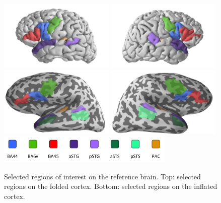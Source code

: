 \begin{figure}[h]
\begin{center}
\vspace{7mm}
\includegraphics[width=0.49\textwidth]{pics/dh55a-pial-lh}
\includegraphics[width=0.49\textwidth]{pics/dh55a-pial-rh}
\includegraphics[width=0.49\textwidth]{pics/dh55a-inflated-lh}
\includegraphics[width=0.49\textwidth]{pics/dh55a-inflated-rh}
\includegraphics[width=0.75\textwidth]{pics/3_3_ROIlegend}
\caption{\label{3.3.ROI} Selected regions of interest on the reference brain. Top: selected regions on the folded cortex. Bottom: selected regions on the inflated cortex.}
\end{center}
\end{figure}

